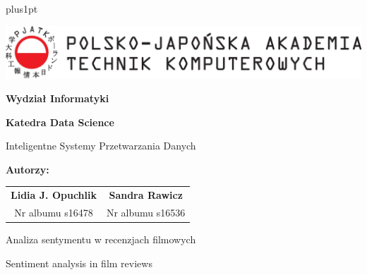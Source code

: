 \documentclass[12pt]{ociamthesis}  %
\begin{document}
	
	

\baselineskip=18pt plus1pt

\setcounter{secnumdepth}{3}
\setcounter{tocdepth}{3}





\begin{center}
	\includegraphics[width=1\textwidth]{images/logo_pl.jpg}
	
	\vspace*{1.25cm}
	\textbf{Wydział Informatyki}
	
	\vspace*{1.25cm}
	\textbf{Katedra Data Science}
	
	\vspace*{0.25cm}
	Inteligentne Systemy Przetwarzania Danych
	
	\vspace*{1.25cm}
	\begin{center}
	\textbf{	Autorzy:} \\
	\end{center}
\begin{center}
	\begin{tabular}{ c c }
		\textbf{Lidia J. Opuchlik} \qquad & \qquad \textbf{Sandra Rawicz} \\ 
		Nr albumu s16478 \qquad & \qquad Nr albumu s16536 \\  
   
	\end{tabular}
\end{center}
	
	\vspace{1.5cm}
	{\huge Analiza sentymentu w recenzjach filmowych}
	
	\vspace{0.5cm}
	
	{\large Sentiment analysis in film reviews  \par}
	
	
	
\end{center}
\end{document}
